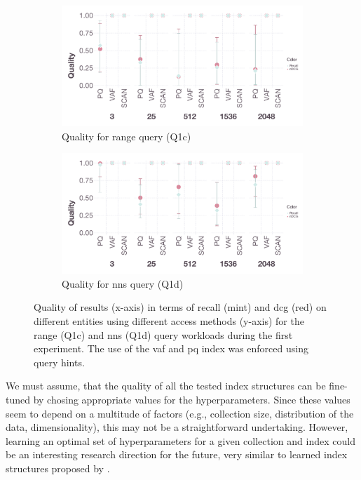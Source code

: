 \begin{figure}[tb]
    \centering
    \begin{subfigure}[b]{\textwidth}
        \centering
        \includegraphics[width=\textwidth]{figures/analytics/analytics-cottontail-quality-range}
        \caption{Quality for range query (Q1c)}
        \label{figure:cottontail_analytics_quality_range}
    \end{subfigure}
    \hfill
    \centering
    \begin{subfigure}[b]{\textwidth}
        \centering
        \includegraphics[width=\textwidth]{figures/analytics/analytics-cottontail-quality-nns}
        \caption{Quality for \acrshort{nns} query (Q1d)}
        \label{figure:cottontail_analytics_quality_nns}
    \end{subfigure}
    \caption{Quality of results (x-axis) in terms of recall (mint) and \acrshort{dcg} (red) on different entities using different access methods (y-axis) for the range (Q1c) and \acrshort{nns} (Q1d) query workloads during the first experiment. The use of the \acrshort{vaf} and \acrshort{pq} index was enforced using query hints.}
    \label{figure:cottontail_analytics_quality}
\end{figure}

We must assume, that the quality of all the tested index structures can be fine-tuned by chosing appropriate values for the hyperparameters. Since these values seem to depend on a multitude of factors (e.g., collection size, distribution of the data, dimensionality), this may not be a straightforward undertaking. However, learning an optimal set of hyperparameters for a given collection and index  could be an interesting research direction for the future, very similar to learned index structures proposed by \cite{Kraska:2018Case}.


